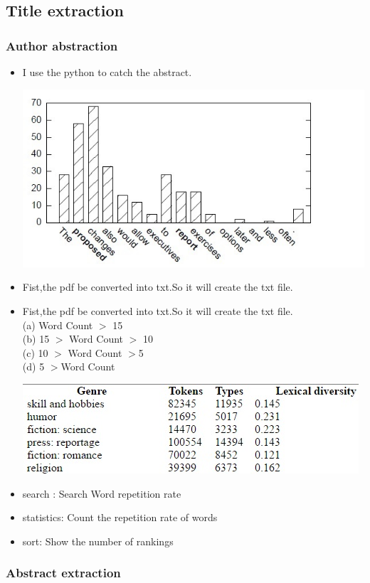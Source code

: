	
\subsection*{Title extraction}

\subsubsection*{Author abstraction}
\begin{itemize}
	\item I use the python to catch the abstract.
	\begin{center}
		\includegraphics[width=0.8\columnwidth]{Union_Background_Chart_2}
	\end{center}
	\item Fist,the pdf be converted into txt.So it will create the txt file.\\ 
	\item Fist,the pdf be converted into txt.So it will create the txt file.\\ 	
	(a) Word Count $>$ 15\\
	(b) 15 $>$ Word Count $>$ 10\\
	(c) 10 $>$ Word Count $>$5\\
	(d) 5 $>$Word Count	
	\begin{center}
		\includegraphics[width=0.8\columnwidth]{Union_Background_Chart_3}
	\end{center}
	\item search : Search Word repetition rate
	\item statistics: Count the repetition rate of words
	\item sort: Show the number of rankings
\end{itemize}

\subsubsection*{Abstract extraction}

\nwepage
